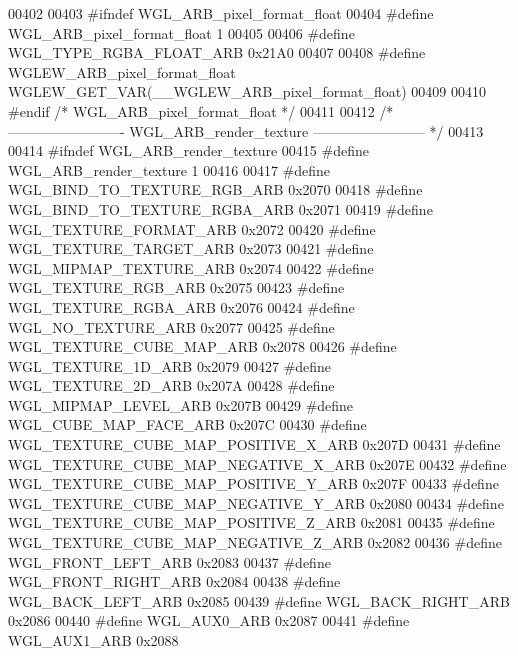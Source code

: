 \begin{DoxyCode}
00402 
00403 \textcolor{preprocessor}{#ifndef WGL\_ARB\_pixel\_format\_float}
00404 \textcolor{preprocessor}{#define WGL\_ARB\_pixel\_format\_float 1}
00405 
00406 \textcolor{preprocessor}{#define WGL\_TYPE\_RGBA\_FLOAT\_ARB 0x21A0}
00407 
00408 \textcolor{preprocessor}{#define WGLEW\_ARB\_pixel\_format\_float WGLEW\_GET\_VAR(\_\_WGLEW\_ARB\_pixel\_format\_float)}
00409 
00410 \textcolor{preprocessor}{#endif }\textcolor{comment}{/* WGL\_ARB\_pixel\_format\_float */}\textcolor{preprocessor}{}
00411 
00412 \textcolor{comment}{/* ------------------------- WGL\_ARB\_render\_texture ------------------------ */}
00413 
00414 \textcolor{preprocessor}{#ifndef WGL\_ARB\_render\_texture}
00415 \textcolor{preprocessor}{#define WGL\_ARB\_render\_texture 1}
00416 
00417 \textcolor{preprocessor}{#define WGL\_BIND\_TO\_TEXTURE\_RGB\_ARB 0x2070}
00418 \textcolor{preprocessor}{#define WGL\_BIND\_TO\_TEXTURE\_RGBA\_ARB 0x2071}
00419 \textcolor{preprocessor}{#define WGL\_TEXTURE\_FORMAT\_ARB 0x2072}
00420 \textcolor{preprocessor}{#define WGL\_TEXTURE\_TARGET\_ARB 0x2073}
00421 \textcolor{preprocessor}{#define WGL\_MIPMAP\_TEXTURE\_ARB 0x2074}
00422 \textcolor{preprocessor}{#define WGL\_TEXTURE\_RGB\_ARB 0x2075}
00423 \textcolor{preprocessor}{#define WGL\_TEXTURE\_RGBA\_ARB 0x2076}
00424 \textcolor{preprocessor}{#define WGL\_NO\_TEXTURE\_ARB 0x2077}
00425 \textcolor{preprocessor}{#define WGL\_TEXTURE\_CUBE\_MAP\_ARB 0x2078}
00426 \textcolor{preprocessor}{#define WGL\_TEXTURE\_1D\_ARB 0x2079}
00427 \textcolor{preprocessor}{#define WGL\_TEXTURE\_2D\_ARB 0x207A}
00428 \textcolor{preprocessor}{#define WGL\_MIPMAP\_LEVEL\_ARB 0x207B}
00429 \textcolor{preprocessor}{#define WGL\_CUBE\_MAP\_FACE\_ARB 0x207C}
00430 \textcolor{preprocessor}{#define WGL\_TEXTURE\_CUBE\_MAP\_POSITIVE\_X\_ARB 0x207D}
00431 \textcolor{preprocessor}{#define WGL\_TEXTURE\_CUBE\_MAP\_NEGATIVE\_X\_ARB 0x207E}
00432 \textcolor{preprocessor}{#define WGL\_TEXTURE\_CUBE\_MAP\_POSITIVE\_Y\_ARB 0x207F}
00433 \textcolor{preprocessor}{#define WGL\_TEXTURE\_CUBE\_MAP\_NEGATIVE\_Y\_ARB 0x2080}
00434 \textcolor{preprocessor}{#define WGL\_TEXTURE\_CUBE\_MAP\_POSITIVE\_Z\_ARB 0x2081}
00435 \textcolor{preprocessor}{#define WGL\_TEXTURE\_CUBE\_MAP\_NEGATIVE\_Z\_ARB 0x2082}
00436 \textcolor{preprocessor}{#define WGL\_FRONT\_LEFT\_ARB 0x2083}
00437 \textcolor{preprocessor}{#define WGL\_FRONT\_RIGHT\_ARB 0x2084}
00438 \textcolor{preprocessor}{#define WGL\_BACK\_LEFT\_ARB 0x2085}
00439 \textcolor{preprocessor}{#define WGL\_BACK\_RIGHT\_ARB 0x2086}
00440 \textcolor{preprocessor}{#define WGL\_AUX0\_ARB 0x2087}
00441 \textcolor{preprocessor}{#define WGL\_AUX1\_ARB 0x2088}

\end{DoxyCode}
